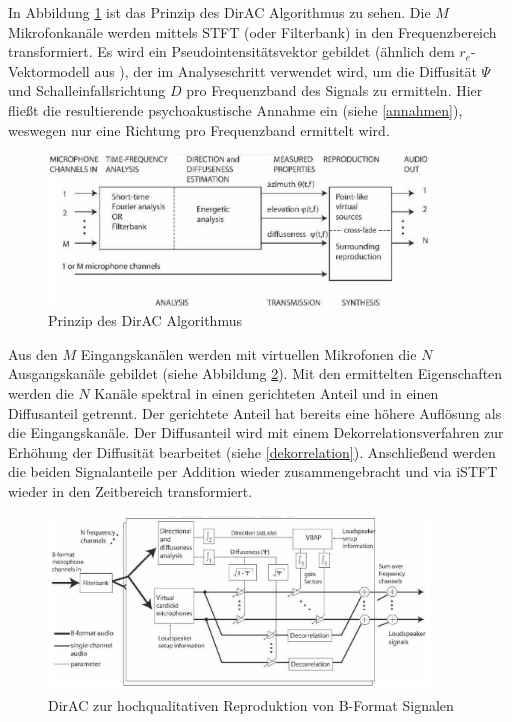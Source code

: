 In Abbildung \ref{fig:dirac_flow_general} ist das Prinzip des DirAC Algorithmus zu sehen. Die $M$ Mikrofonkanäle werden mittels STFT (oder Filterbank) in den Frequenzbereich transformiert. Es wird ein Pseudointensitätsvektor gebildet (ähnlich dem $r_e$-Vektormodell aus \cite{ambi-book}), der im Analyseschritt verwendet wird, um die Diffusität $\Psi$ und Schalleinfallsrichtung $D$ pro Frequenzband des Signals zu ermitteln. Hier fließt die resultierende psychoakustische Annahme ein (siehe \ref{annahmen}), weswegen nur eine Richtung pro Frequenzband ermittelt wird.

\begin{figure}[!ht]
  \centering
  \includegraphics[width=0.9\textwidth]{funktionsweise/pic/pulkki_dirac_flow.png}
  \caption{Prinzip des DirAC Algorithmus\protect\footnotemark}
  \label{fig:dirac_flow_general}
\end{figure}


Aus den $M$ Eingangskanälen werden mit virtuellen Mikrofonen die $N$ Ausgangskanäle gebildet (siehe Abbildung \ref{fig:dirac_flow_high}). Mit den ermittelten Eigenschaften werden die $N$ Kanäle spektral in einen gerichteten Anteil und in einen Diffusanteil getrennt. Der gerichtete Anteil hat bereits eine höhere Auflösung als die Eingangskanäle. Der Diffusanteil wird mit einem Dekorrelationsverfahren zur Erhöhung der Diffusität bearbeitet (siehe \ref{dekorrelation}). Anschließend werden die beiden Signalanteile per Addition wieder zusammengebracht und via iSTFT wieder in den Zeitbereich transformiert.

\begin{figure}[!ht]
  \centering
  \includegraphics[width=0.9\textwidth]{funktionsweise/pic/pulkki_dirac_flow_2.png}
  \caption{DirAC zur hochqualitativen Reproduktion von B-Format Signalen\protect\footnotemark}
  \label{fig:dirac_flow_high}
\end{figure}

